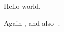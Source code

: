 \documentclass{article}
\begin{document}
Hello \foo world.

Again \foo, and also \bar.
\end{document}
